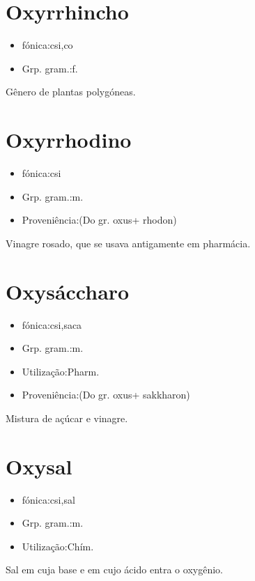 \section{Oxyrrhincho}
\begin{itemize}
\item {fónica:csi,co}
\end{itemize}
\begin{itemize}
\item {Grp. gram.:f.}
\end{itemize}
Gênero de plantas polygóneas.
\section{Oxyrrhodino}
\begin{itemize}
\item {fónica:csi}
\end{itemize}
\begin{itemize}
\item {Grp. gram.:m.}
\end{itemize}
\begin{itemize}
\item {Proveniência:(Do gr. \textunderscore oxus\textunderscore  + \textunderscore rhodon\textunderscore )}
\end{itemize}
Vinagre rosado, que se usava antigamente em pharmácia.
\section{Oxysáccharo}
\begin{itemize}
\item {fónica:csi,saca}
\end{itemize}
\begin{itemize}
\item {Grp. gram.:m.}
\end{itemize}
\begin{itemize}
\item {Utilização:Pharm.}
\end{itemize}
\begin{itemize}
\item {Proveniência:(Do gr. \textunderscore oxus\textunderscore  + \textunderscore sakkharon\textunderscore )}
\end{itemize}
Mistura de açúcar e vinagre.
\section{Oxysal}
\begin{itemize}
\item {fónica:csi,sal}
\end{itemize}
\begin{itemize}
\item {Grp. gram.:m.}
\end{itemize}
\begin{itemize}
\item {Utilização:Chím.}
\end{itemize}
Sal em cuja base e em cujo ácido entra o oxygênio.
